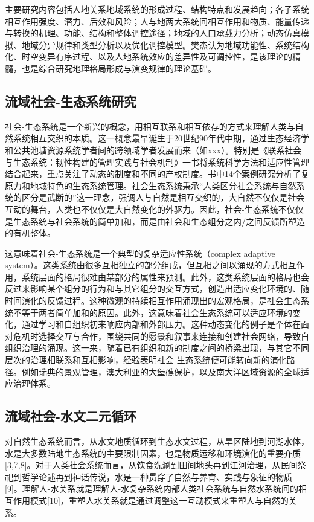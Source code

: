 主要研究内容包括人地关系地域系统的形成过程、结构特点和发展趋向；各子系统相互作用强度、潜力、后效和风险；人与地两大系统间相互作用和物质、能量传递与转换的机理、功能、结构和整体调控途径；地域的人口承载力分析；动态仿真模拟、地域分异规律和类型分析以及优化调控模型。樊杰认为地域功能性、系统结构化、时空变异有序过程、以及人地系统效应的差异性及可调控性，是该理论的精髓，也是综合研究地理格局形成与演变规律的理论基础。


\subsection{流域社会-生态系统研究}

社会-生态系统是一个新兴的概念，用相互联系和相互依存的方式来理解人类与自然系统相互交织的本质。这一概念最早诞生于20世纪90年代中期，通过生态经济学和公共池塘资源系统学者间的跨领域学者发展而来（如xxx）。特别是《联系社会与生态系统：韧性构建的管理实践与社会机制》一书将系统科学方法和适应性管理结合起来，重点关注了动态的制度和不同的产权制度。书中14个案例研究分析了复原力和地域特色的生态系统管理。社会生态系统秉承“人类区分社会系统与自然系统的区分是武断的”这一理念，强调人与自然是相互交织的，大自然不仅仅是社会互动的舞台，人类也不仅仅是大自然变化的外驱力。因此，社会-生态系统不仅仅是生态系统与社会系统的简单加和，而是由社会和生态组分之内/之间反馈所塑造的有机整体。

这意味着社会-生态系统是一个典型的复杂适应性系统（complex adaptive system）。这类系统由很多互相独立的部分组成，但互相之间以涌现的方式相互作用，系统层面的格局很难由某部分的属性来预测。此外，这类系统层面的格局也会反过来影响某个组分的行为和与其它组分的交互方式，创造出适应变化环境的、随时间演化的反馈过程。这种微观的持续相互作用涌现出的宏观格局，是社会生态系统不等于两者简单加和的原因。此外，这意味着社会生态系统可以适应环境的变化，通过学习和自组织初来响应内部和外部压力。这种动态变化的例子是个体在面对危机时选择交互与合作，围绕共同的愿景和叙事来连接和创建社会网络，导致自组织治理的涌现。这一来，随着已有组织和新的制度之间的桥梁出现，与其它不同层次的治理相联系和互相影响，经验表明社会-生态系统便可能转向新的演化路径。例如瑞典的景观管理，澳大利亚的大堡礁保护，以及南大洋区域资源的全球适应治理体系。

\subsection{流域社会-水文二元循环}

对自然生态系统而言，从水文地质循环到生态水文过程，从旱区陆地到河湖水体，水是大多数陆地生态系统的主要限制因素，也是物质运移和环境演化的重要介质[3,7,8]。对于人类社会系统而言，从饮食洗涮到田间地头再到江河治理，从民间祭祀到哲学论述再到神话传说，水是一种贯穿了自然与养育、实践与象征的物质[9]。理解人-水关系就是理解人-水复杂系统内部人类社会系统与自然水系统间的相互作用模式[10]，重塑人水关系就是通过调整这一互动模式来重塑人与自然的关系。

